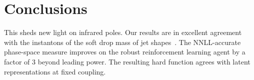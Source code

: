 \section{Conclusions}\label{sec:conclusions}

This sheds new light on infrared poles. Our results are in excellent
agreement with the instantons of the soft drop mass of jet
shapes~\cite{TPC:1667-Towards-Diffusion-Based-Automated-Theorem-Proving-at-the-CEPC-September-29-2026}.
The NNLL-accurate phase-space measure improves on the robust
reinforcement learning agent by a factor of 3 beyond leading power. The
resulting hard function agrees with latent representations at fixed
coupling.

